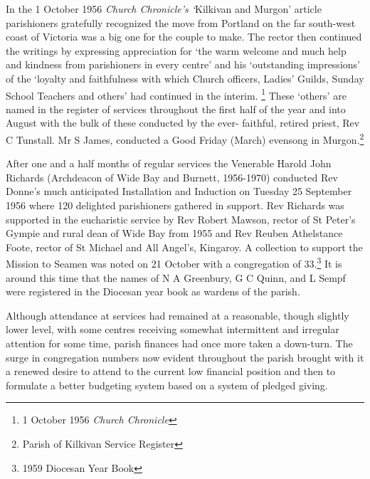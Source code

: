 In the 1 October 1956 \emph{Church Chronicle's `}Kilkivan and Murgon'
article parishioners gratefully recognized the move from Portland on the
far south-west coast of Victoria was a big one for the couple to make.
The rector then continued the writings by expressing appreciation for
`the warm welcome and much help and kindness from parishioners in every
centre' and his `outstanding impressions' of the `loyalty and
faithfulness with which Church officers, Ladies' Guilds, Sunday School
Teachers and others' had continued in the interim. \footnote{1 October
  1956 \emph{Church Chronicle}} These `others' are named in the register
of services throughout the first half of the year and into August with
the bulk of these conducted by the ever- faithful, retired priest, Rev C
Tunstall. Mr S James, conducted a Good Friday (March) evensong in
Murgon.\footnote{Parish of Kilkivan Service Register}

After one and a half months of regular services the Venerable Harold
John Richards (Archdeacon of Wide Bay and Burnett, 1956-1970) conducted
Rev Donne's much anticipated Installation and Induction on Tuesday 25
September 1956 where 120 delighted parishioners gathered in support. Rev
Richards was supported in the eucharistic service by Rev Robert Mawson,
rector of St Peter's Gympie and rural dean of Wide Bay from 1955 and Rev
Reuben Athelstance Foote, rector of St Michael and All Angel's,
Kingaroy. A collection to support the Mission to Seamen was noted on 21
October with a congregation of 33.\footnote{1959 Diocesan Year Book} It
is around this time that the names of N A Greenbury, G C Quinn, and L
Sempf were registered in the Diocesan year book as wardens of the
parish.

Although attendance at services had remained at a reasonable, though
slightly lower level, with some centres receiving somewhat intermittent
and irregular attention for some time, parish finances had once more
taken a down-turn. The surge in congregation numbers now evident
throughout the parish brought with it a renewed desire to attend to the
current low financial position and then to formulate a better budgeting
system based on a system of pledged giving.

